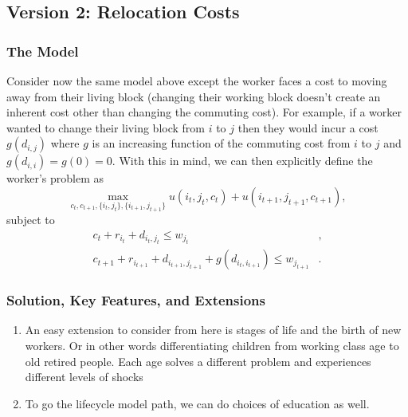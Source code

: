 \documentclass[11pt,english]{article}
\begin{document}
\subsection{Version 2: Relocation Costs}

\subsubsection{The Model}

Consider now the same model above except the worker faces a cost to moving away from their living block (changing their working block doesn't create an inherent cost other than changing the commuting cost). For example, if a worker wanted to change their living block from $i$ to $j$ then they would incur a cost $g(d_{i,j})$ where $g$ is an increasing function of the commuting cost from $i$ to $j$ and $g(d_{i,i}) = g(0) = 0$. With this in mind, we can then explicitly define the worker's problem as $$\max_{c_t, c_{t+1}, \{i_t, j_t\}, \{i_{t+1}, j_{t+1}\}} u\left(i_t,j_t, c_t\right) + u\left(i_{t+1},j_{t+1}, c_{t+1}\right),$$
subject to \begin{align*}
c_t + r_{i_t} + d_{i_t,j_t}\leq w_{j_t}&,\\
c_{t+1} + r_{i_{t+1}} + d_{i_{t+1}, j_{t+1}} + g(d_{i_t, i_{t+1}})\leq w_{j_{t+1}}&.
\end{align*}

\subsubsection{Solution, Key Features, and Extensions}

\begin{enumerate}
\item An easy extension to consider from here is stages of life and the birth of new workers. Or in other words differentiating children from working class age to old retired people. Each age solves a different problem and experiences different levels of shocks 

\item To go the lifecycle model path, we can do choices of education as well.

\end{enumerate}

\newpage




\end{document}
